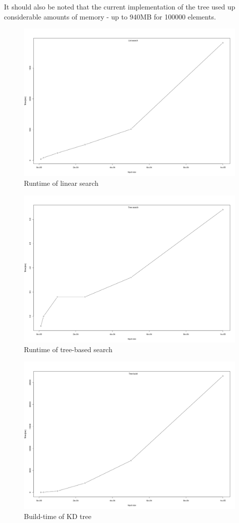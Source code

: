 \documentclass[a4paper]{scrartcl}
\begin{document}
It should also be noted that the current implementation of the tree used up
considerable amounts of memory - up to 940MB for 100000 elements.

\begin{figure}
	\centering
	\caption{Runtime of linear search}
	\includegraphics[width=\linewidth]{resources/search_time_list.png}
\end{figure}

\begin{figure}
	\centering
	\caption{Runtime of tree-based search}
	\includegraphics[width=\linewidth]{resources/search_time_tree.png}
\end{figure}

\begin{figure}
	\centering
	\caption{Build-time of KD tree}
	\includegraphics[width=\linewidth]{resources/build_time_tree.png}
\end{figure}
\end{document}
